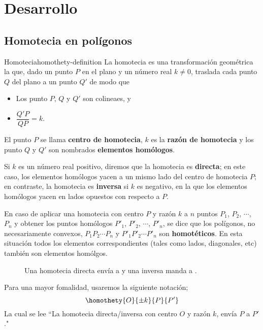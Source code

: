 \section{Desarrollo}

\subsection{Homotecia en polígonos}

\begin{section-definition.tcb}{Homotecia}{homothety-definition}
    La homotecia es una transformación geométrica la que, dado un punto $P$ en el plano y un número real $k \neq 0$, traslada cada punto $Q$ del plano a un punto $Q'$ de modo que
    \begin{itemize}
        \item Los punto $P$, $Q$ y $Q'$ son colineaes, y
        \item $\dfrac{Q' P}{QP} = k$.
    \end{itemize}
\end{section-definition.tcb}

El punto $P$ se llama \textbf{centro de homotecia}, $k$ es la \textbf{razón de homotecia} y los punto $Q$ y $Q'$ son nombrados \textbf{elementos homólogos}.

Si $k$ es un número real positivo, diremos que la homotecia es \textbf{directa}; en este caso, los elementos homólogos yacen a un mismo lado del centro de homotecia $P$; en contraste, la homotecia es \textbf{inversa} si $k$ es negativo, en la que los elementos homólogos yacen en lados opuestos con respecto a $P$.

En caso de aplicar una homotecia con centro $P$ y razón $k$ a $n$ puntos $P_1$, $P_2$, $\cdots$, $P_n$ y obtener los puntos homólogos $P'_1$, $P'_2$, $\cdots$, $P'_n$, se dice que los polígonos, no necesariamente convexos, $P_1 P_2 \cdots P_n$ y $P'_1 P'_2 \cdots P'_n$ son \textbf{homotéticos}.
En esta situación todos los elementos correspondientes (tales como lados, diagonales, etc) también son elementos homólgos.

\begin{figure}[H]
    \centering
    
    \caption{Una homotecia directa envía  a  y una inversa manda  a .}
    \label{fig:homothety-definition}
\end{figure}

\begin{remark.tcb}
    Para una mayor fomalidad, usaremos la siguiente notación;
    \[
        \homothety{O}{\pm k}{P}{P'}
    \]
    La cual se lee ``La homotecia directa/inversa con centro $O$ y razón $k$, envía $P$ a $P'$."
\end{remark.tcb}

